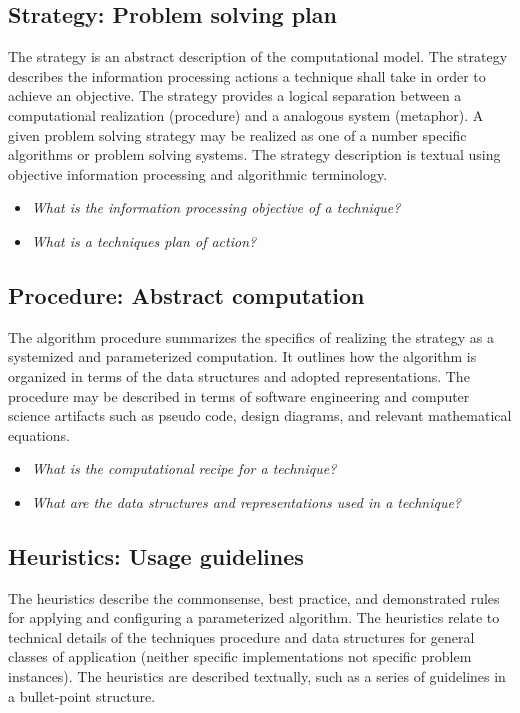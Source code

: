\documentclass[a4paper, 11pt]{article}
\begin{document}
\subsection{Strategy: Problem solving plan}
The strategy is an abstract description of the computational model. The strategy describes the information processing actions a technique shall take in order to achieve an objective. The strategy provides a logical separation between a computational realization (procedure) and a analogous system (metaphor). A given problem solving strategy may be realized as one of a number specific algorithms or problem solving systems. The strategy description is textual using objective information processing and algorithmic terminology.

\begin{itemize}
	\item \emph{What is the information processing objective of a technique?}
	\item \emph{What is a techniques plan of action?}
\end{itemize}

\subsection{Procedure: Abstract computation}
The algorithm procedure summarizes the specifics of realizing the strategy as a systemized and parameterized computation. It outlines how the algorithm is organized in terms of the data structures and adopted representations. The procedure may be described in terms of software engineering and computer science artifacts such as pseudo code, design diagrams, and relevant mathematical equations.

\begin{itemize}
	\item \emph{What is the computational recipe for a technique?}
	\item \emph{What are the data structures and representations used in a technique?}
\end{itemize}

\subsection{Heuristics: Usage guidelines}
The heuristics describe the commonsense, best practice, and demonstrated rules for applying and configuring a parameterized algorithm. The heuristics relate to technical details of the techniques procedure and data structures for general classes of application (neither specific implementations not specific problem instances). The heuristics are described textually, such as a series of guidelines in a bullet-point structure.
\end{document}
